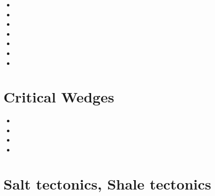 \begin{scriptsize}
\begin{itemize}
\item[\nineteenninetyfive] 
\item[\nineteenninetyeight] 
\item[\twothousandsix] 
\item[\twothousandeight] 
\item[\twothousandten] 
\item[\twothousandsixteen] 
\item[\twothousandtwentythree] 
\end{itemize}
\end{scriptsize}




\section{Critical Wedges}

\begin{scriptsize}
\begin{itemize}
\item[\nineteenninetyfour] 
\item[\twothousandsix] 
\item[\twothousandeight] 
\item[\twothousandthirteen] 
\end{itemize}
\end{scriptsize}

\section{Salt tectonics, Shale tectonics}

